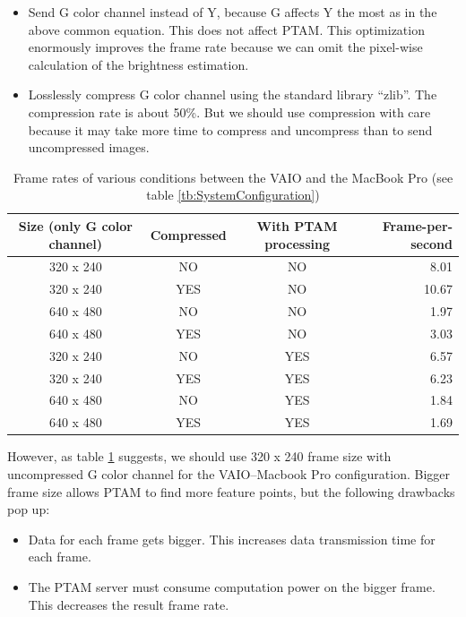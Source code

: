 \begin{itemize}
	\item Send G color channel instead of Y, because G affects Y the most as in the above common equation. This does not affect PTAM. This optimization enormously improves the frame rate because we can omit the pixel-wise calculation of the brightness estimation.
	\item Losslessly compress G color channel using the standard library ``zlib''. The compression rate is about 50\%. But we should use compression with care because it may take more time to compress and uncompress than to send uncompressed images.
\end{itemize}

\begin{table}[tb]
	\begin{center}
		\caption{Frame rates of various conditions between the VAIO and the MacBook Pro (see table \ref{tb:SystemConfiguration})}
		\label{tb:FrameRates}
		\begin{tabular}{|c|c|c|r|}
			\hline
			Size (only G color channel) & Compressed & With PTAM processing & Frame-per-second \\
			\hline
			320 x 240 & NO         & NO                   &  8.01 \\
			320 x 240 & YES        & NO                   & 10.67 \\
			640 x 480 & NO         & NO                   &  1.97 \\
			640 x 480 & YES        & NO                   &  3.03 \\
			320 x 240 & NO         & YES                  &  6.57 \\
			320 x 240 & YES        & YES                  &  6.23 \\
			640 x 480 & NO         & YES                  &  1.84 \\
			640 x 480 & YES        & YES                  &  1.69 \\
			\hline
		\end{tabular}
	\end{center}
\end{table}

However, as table \ref{tb:FrameRates} suggests, we should use 320 x 240 frame size with uncompressed G color channel for the VAIO--Macbook Pro configuration. Bigger frame size allows PTAM to find more feature points, but the following drawbacks pop up:

\begin{itemize}
	\item Data for each frame gets bigger. This increases data transmission time for each frame.
	\item The PTAM server must consume computation power on the bigger frame. This decreases the result frame rate.
\end{itemize}

